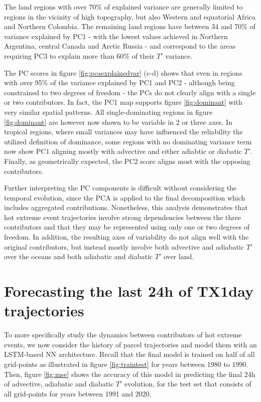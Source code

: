 \documentclass[11pt,a4paper,twoside,openright]{report}
\theoremstyle{definition}
\begin{document}
The land regions with over 70\% of explained variance are generally limited to regions in the vicinity of high topography, but also Western and equatorial Africa and Northern Colombia. The remaining land regions have between 34 and 70\% of variance explained by PC1 - with the lowest values achieved in Northern Argentina, central Canada and Arctic Russia - and correspond to the areas requiring PC3 to explain more than 60\% of their \(T'\) variance.

The PC scores in figure \ref{fig:pcaexplainedvar} (c-d) shows that even in regions with over 95\% of the variance explained by PC1 and PC2 - although being constrained to two degrees of freedom - the PCs do not clearly align with a single or two contributors. In fact, the PC1 map supports figure \ref{fig:dominant} with very similar spatial patterns. All single-dominating regions in figure \ref{fig:dominant} are however now shown to be variable in 2 or three axes. In tropical regions, where small variances may have influenced the reliability the utilized definition of dominance, some regions with no dominating variance term now show PC1 aligning mostly with advective and either adiabtic or diabatic \(T'\). Finally, as geometrically expected, the PC2 score aligns most with the opposing contributors.

Further interpreting the PC components is difficult without considering the temporal evolution, since the PCA is applied to the final decomposition which includes aggregated contributions. Nonetheless, this analysis demonstrates that hot extreme event trajectories involve strong dependencies between the three contributors and that they may be represented using only one or two degrees of freedom. In addition, the resulting axes of variability do not align well with the original contributors, but instead mostly involve both advective and adiabatic \(T'\) over the oceans and both adiabatic and diabatic \(T'\) over land.

\section{Forecasting the last 24h of TX1day trajectories}\label{forecasting-the-last-24h-of-tx1day-trajectories}

To more specifically study the dynamics between contributors of hot extreme events, we now consider the history of parcel trajectories and model them with an LSTM-based NN architecture. Recall that the final model is trained on half of all grid-points as illustrated in figure \ref{fig:traintest} for years between 1980 to 1990. Then, figure \ref{fig:mse} shows the accuracy of this model in predicting the final 24h of advective, adiabatic and diabatic \(T'\) evolution, for the test set that consists of all grid-points for years between 1991 and 2020.
\end{document}
